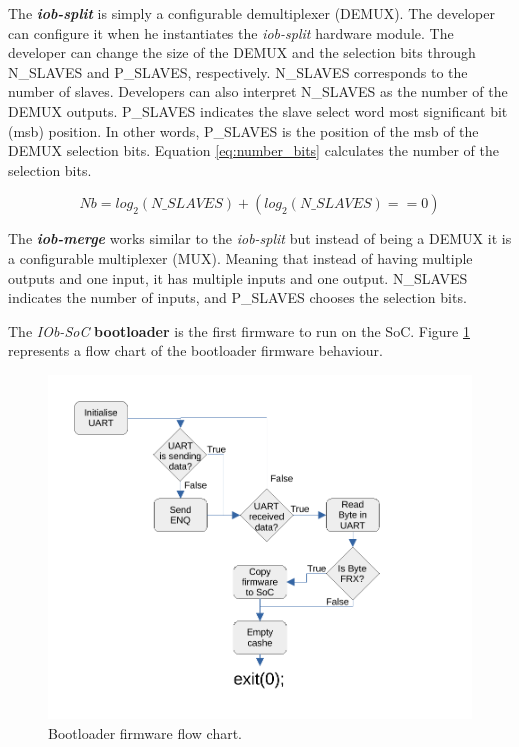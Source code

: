 The \textbf{\textit{iob-split}} is simply a configurable demultiplexer (DEMUX). The developer can configure it when he instantiates the \textit{iob-split} hardware module. The developer can change the size of the DEMUX and the selection bits through N\_SLAVES and P\_SLAVES, respectively. N\_SLAVES corresponds to the number of slaves. Developers can also interpret N\_SLAVES as the number of the DEMUX outputs. P\_SLAVES indicates the slave select word most significant bit (msb) position. In other words, P\_SLAVES is the position of the msb of the DEMUX selection bits. Equation \ref{eq:number_bits} calculates the number of the selection bits.

\begin{equation}
    \label{eq:number_bits}
    Nb = log_2(N\_SLAVES)+(log_2(N\_SLAVES)==0)
\end{equation}

The \textbf{\textit{iob-merge}} works similar to the \textit{iob-split} but instead of being a DEMUX it is a configurable multiplexer (MUX). Meaning that instead of having multiple outputs and one input, it has multiple inputs and one output. N\_SLAVES indicates the number of inputs, and P\_SLAVES chooses the selection bits.

The \textit{IOb-SoC} \textbf{bootloader} is the first firmware to run on the SoC. Figure \ref{fig:boot_flow} represents a flow chart of the bootloader firmware behaviour.

\begin{figure}[!h]
    \centering
    \includegraphics[width=\linewidth]{../images/boot_flow.pdf}
    \caption{Bootloader firmware flow chart.}
    \label{fig:boot_flow}
\end{figure}

